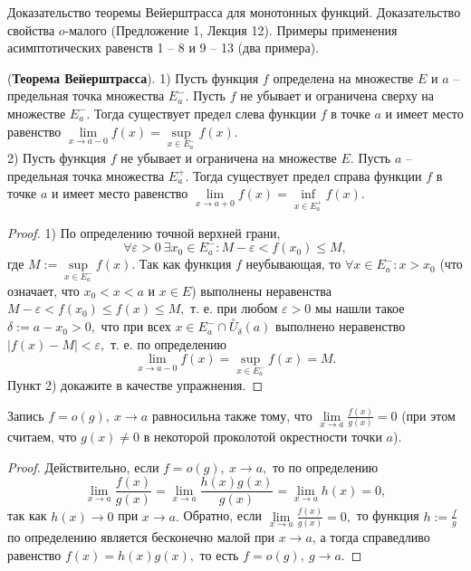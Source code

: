 \newpage
\begin{problem}
Доказательство теоремы Вейерштрасса для монотонных функций. Доказательство свойства $o$-малого (Предложение 1, Лекция 12). Примеры применения асимптотических равенств 1 – 8 и 9 – 13 (два примера).
\end{problem}

\begin{theorem} (\textbf{Теорема Вейерштрасса}).
1) Пусть функция $f$ определена на множестве $E$
и $a$ -- предельная точка
множества $E^-_a.$
Пусть $f$ не убывает и ограничена сверху
на множестве $E^-_a.$ Тогда существует предел слева
функции $f$ в точке $a$ и имеет место равенство
$
\lim\limits_{x\rightarrow a-0}f(x)=
\sup\limits_{x \in E^-_a}f(x).
$\\
2) Пусть функция $f$ не убывает и ограничена
на множестве $E.$ Пусть $a$ -- предельная точка
множества $E^+_a.$ Тогда существует предел справа
функции $f$ в точке $a$ и имеет место равенство
$
\lim\limits_{x\rightarrow a+0}f(x)=
\inf\limits_{x \in E^+_a}f(x).
$
\end{theorem}
\begin{proof}
1) По определению точной верхней грани,
$$\forall\varepsilon>0 \ \exists x_0 \in
E^-_a: M-\varepsilon < f(x_0)\leq M,$$ где
$M:=\sup\limits_{x \in E^-_a}f(x).$
Так как функция $f$ неубывающая, то
$\forall x \in E^-_a: x>x_0$ (что означает,
что $x_0<x<a$ и $x \in E$) выполнены
неравенства $M-\varepsilon<f(x_0)\leq f(x)
\leq M,$ т. е. при любом $\varepsilon>0$
мы нашли такое $\delta:= a-x_0>0,$ что
при всех $x \in E^-_a\cap
\stackrel{\circ}{U}_{\delta}(a)$
выполнено неравенство $|f(x)-M|<\varepsilon,$
т. е. по определению
$$
\lim\limits_{x\rightarrow a-0}f(x)=
\sup\limits_{x \in E^-_a}f(x)=M.
$$
Пункт 2) докажите в качестве упражнения.
\end{proof}

\begin{proposition}
    Запись $f=o(g), \ x\rightarrow a$ равносильна
    также тому,
    что $\lim\limits_{x\rightarrow a}
    \frac{f(x)}{g(x)}=0$
    (при этом считаем, что $g(x)\neq0$
    в некоторой проколотой окрестности
    точки $a$).
    \end{proposition}
    \begin{proof}
    Действительно,
    если $f=o(g), \ x\rightarrow a,$ то
    по определению
    $$
    \lim\limits_{x\rightarrow a}
    \frac{f(x)}{g(x)}=
    \lim\limits_{x\rightarrow a}
    \frac{h(x)g(x)}{g(x)}=
    \lim\limits_{x\rightarrow a}
    h(x)=0,
    $$
    так как $h(x)\rightarrow 0$
    при $x\rightarrow a.$ Обратно,
    если $\lim\limits_{x\rightarrow a}
    \frac{f(x)}{g(x)}=0,$ то функция
    $h:=\frac{f}{g}$ по
    определению является бесконечно малой
    при $x\rightarrow a$,
    а тогда справедливо равенство
    $f(x)=h(x)g(x),$ то есть $f=o(g), \
    g\rightarrow a.$
    \end{proof}